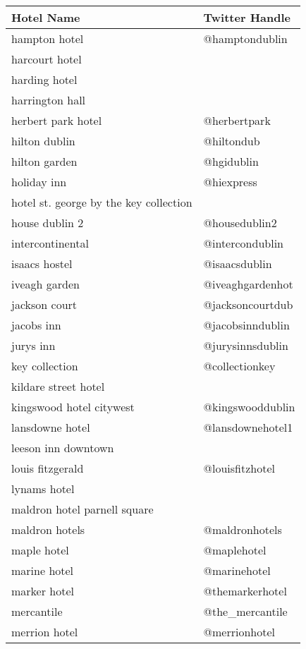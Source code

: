 \begin{table}[h!]
\begin{tabular}{|p{7cm}|p{5cm}|}
\hline
\textbf{Hotel Name} & \textbf{Twitter Handle} \\ \hline
hampton hotel & @hamptondublin \\ \hline
harcourt hotel &  \\ \hline
harding hotel &  \\ \hline
harrington hall &  \\ \hline
herbert park hotel & @herbertpark \\ \hline
hilton dublin & @hiltondub \\ \hline
hilton garden & @hgidublin \\ \hline
holiday inn & @hiexpress \\ \hline
hotel st. george by the key collection &  \\ \hline
house dublin 2 & @housedublin2 \\ \hline
intercontinental & @intercondublin \\ \hline
isaacs hostel & @isaacsdublin \\ \hline
iveagh garden & @iveaghgardenhot \\ \hline
jackson court & @jacksoncourtdub \\ \hline
jacobs inn & @jacobsinndublin \\ \hline
jurys inn & @jurysinnsdublin \\ \hline
key collection & @collectionkey \\ \hline
kildare street hotel &  \\ \hline
kingswood hotel citywest & @kingswooddublin \\ \hline
lansdowne hotel & @lansdownehotel1 \\ \hline
leeson inn downtown &  \\ \hline
louis fitzgerald & @louisfitzhotel \\ \hline
lynams hotel &  \\ \hline
maldron hotel parnell square &  \\ \hline
maldron hotels & @maldronhotels \\ \hline
maple hotel & @maplehotel \\ \hline
marine hotel & @marinehotel \\ \hline
marker hotel & @themarkerhotel \\ \hline
mercantile & @the\_mercantile \\ \hline
merrion hotel & @merrionhotel \\ \hline

\end{tabular}
\end{table}
